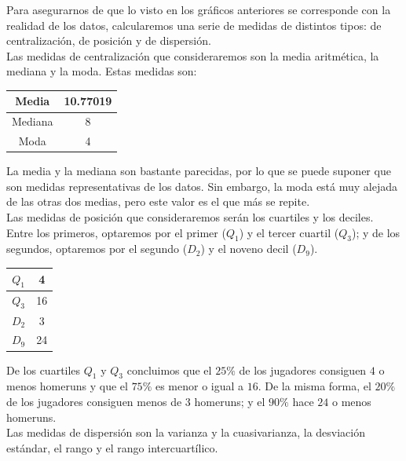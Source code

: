 \documentclass[12pt,a4paper,twoside,openright,titlepage,final]{article}
\begin{document}
Para asegurarnos de que lo visto en los gráficos anteriores se corresponde con la realidad de los datos, calcularemos una serie de medidas de distintos tipos: de centralización, de posición y de dispersión. \\

Las medidas de centralización que consideraremos son la media aritmética, la mediana y la moda. Estas medidas son:

\begin{table}[htbp]
\centering
\begin{tabular}{|c|c|}
\hline Media & 10.77019 \\ 
\hline Mediana & 8 \\ 
\hline Moda & 4  \\ 
\hline 
\end{tabular} 
\end{table}

La media y la mediana son bastante parecidas, por lo que se puede suponer que son medidas representativas de los datos. Sin embargo, la moda está muy alejada de las otras dos medias, pero este valor es el que más se repite.\\


Las medidas de posición que consideraremos serán los cuartiles y los deciles. Entre los primeros, optaremos por el primer ($Q_1$) y el tercer cuartil ($Q_3$); y de los segundos, optaremos por el segundo ($D_2$) y el noveno decil ($D_{9}$). \\

\begin{table}[htbp]
\centering
\begin{tabular}{|c|c|}
\hline $Q_1$ & 4 \\ 
\hline $Q_3$ & 16 \\ 
\hline $D_2$& 3  \\ 
\hline $D_9$& 24  \\ 
\hline 
\end{tabular} 
\end{table}

De los cuartiles $Q_1$ y $Q_3$ concluimos que el $25\%$ de los jugadores consiguen $4$ o menos homeruns y que el $75 \%$ es menor o igual a $16$. De la misma forma, el $20\%$ de los jugadores consiguen menos de $3$ homeruns; y el $90\%$ hace $24$ o menos homeruns.\\

Las medidas de dispersión son la varianza y la cuasivarianza, la desviación estándar, el rango y el rango intercuartílico.\\
\end{document}
